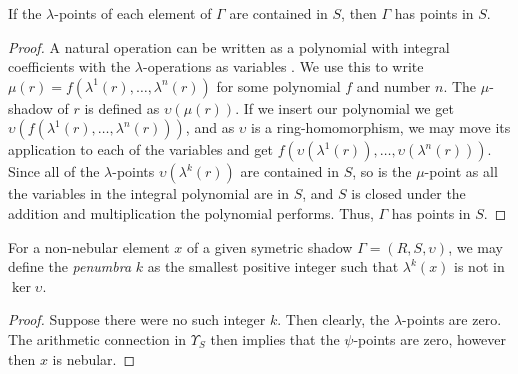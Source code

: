 \begin{proposition}
  If the $\lambda$-points of each element of $\Gamma$ are contained in $S$, then $\Gamma$ has points in $S$.
\end{proposition}

\begin{proof}
  A natural operation can be written as a polynomial with integral coefficients with the $\lambda$-operations as variables . We use this to write $\mu(r) = f(\lambda^1(r), \ldots, \lambda^n(r))$ for some polynomial $f$ and number $n$. The $\mu$-shadow of $r$ is defined as $\upsilon(\mu(r))$. If we insert our polynomial we get $\upsilon(f(\lambda^1(r), \ldots, \lambda^n(r)))$, and as $\upsilon$ is a ring-homomorphism, we may move its application to each of the variables and get $f(\upsilon(\lambda^1(r)), \ldots, \upsilon(\lambda^n(r)))$. Since all of the $\lambda$-points $\upsilon(\lambda^k(r))$ are contained in $S$, so is the $\mu$-point as all the variables in the integral polynomial are in $S$, and $S$ is closed under the addition and multiplication the polynomial performs. Thus, $\Gamma$ has points in $S$.
\end{proof}

\begin{propdef}
  For a non-nebular element $x$ of a given symetric shadow $\Gamma = (R, S, \upsilon)$, we may define the \emph{penumbra} $k$ as the smallest positive integer such that $\lambda^k(x)$ is not in $\ker \upsilon$. 
\end{propdef}

\begin{proof}
  Suppose there were no such integer $k$. Then clearly, the $\lambda$-points are zero. The arithmetic connection in $\Upsilon_S$ then implies that the $\psi$-points are zero, however then $x$ is nebular.
\end{proof}


  
